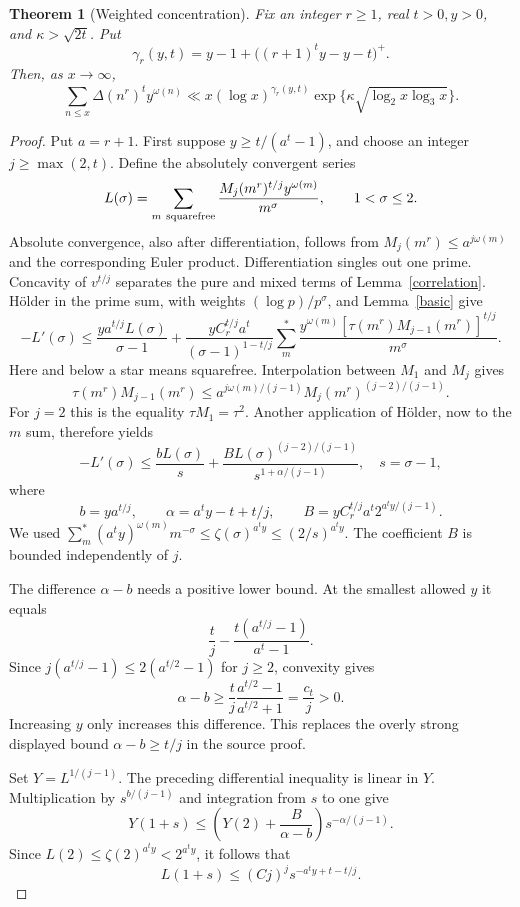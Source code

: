 \documentclass[11pt,a4paper]{article}
\newtheorem{theorem}{Theorem}
\newcommand{\Del}{\Delta}
\newcommand{\om}{\omega}
\begin{document}
\begin{theorem}[Weighted concentration]\label{moment}
Fix an integer $r\ge1$, real $t>0,y>0$, and $\kappa>\sqrt{2t}$.
Put
\[
 \gamma_r(y,t)=y-1+\big((r+1)^t y-y-t\big)^+.
\]
Then, as $x\to\infty$,
\[
 \sum_{n\le x}\Del(n^r)^t y^{\om(n)}
 \ll x(\log x)^{\gamma_r(y,t)}
 \exp\{\kappa\sqrt{\log_2x\log_3x}\}.
\]
\end{theorem}
\begin{proof}
Put $a=r+1$. First suppose $y\ge t/(a^t-1)$, and choose an integer
$j\ge\max(2,t)$. Define the absolutely convergent series
\[
 L(\sigma)=\sum_{m\ {\rm squarefree}}
 \frac{M_j(m^r)^{t/j}y^{\om(m)}}{m^\sigma},\qquad 1<\sigma\le2.
\]
Absolute convergence, also after differentiation, follows from
$M_j(m^r)\le a^{j\om(m)}$ and the corresponding Euler product.
Differentiation singles out one prime. Concavity of $v^{t/j}$ separates
the pure and mixed terms of Lemma~\ref{correlation}. H\"older in the
prime sum, with weights $(\log p)/p^\sigma$, and Lemma~\ref{basic} give
\[
 -L'(\sigma)\le
 \frac{ya^{t/j}L(\sigma)}{\sigma-1}
 +\frac{yC_r^{t/j}a^t}{(\sigma-1)^{1-t/j}}
 \sum_m^*\frac{y^{\om(m)}
 [\tau(m^r)M_{j-1}(m^r)]^{t/j}}{m^\sigma}.
\]
Here and below a star means squarefree. Interpolation between $M_1$
and $M_j$ gives
\[
 \tau(m^r)M_{j-1}(m^r)
 \le a^{j\om(m)/(j-1)}M_j(m^r)^{(j-2)/(j-1)}.
\]
For $j=2$ this is the equality $\tau M_1=\tau^2$.
Another application of H\"older, now to the $m$ sum, therefore yields
\[
 -L'(\sigma)\le\frac{bL(\sigma)}s
 +\frac{BL(\sigma)^{(j-2)/(j-1)}}{s^{1+\alpha/(j-1)}},
 \quad s=\sigma-1,
\]
where
\[
 b=ya^{t/j},\qquad \alpha=a^ty-t+t/j,\qquad
 B=yC_r^{t/j}a^t2^{a^ty/(j-1)}.
\]
We used
$\sum_m^*(a^ty)^{\om(m)}m^{-\sigma}\le\zeta(\sigma)^{a^ty}
\le(2/s)^{a^ty}$. The coefficient $B$ is bounded independently of $j$.

The difference $\alpha-b$ needs a positive lower bound. At the smallest
allowed $y$ it equals
\[
 \frac tj-\frac{t(a^{t/j}-1)}{a^t-1}.
\]
Since $j(a^{t/j}-1)\le2(a^{t/2}-1)$ for $j\ge2$, convexity gives
\[
 \alpha-b\ge\frac tj\frac{a^{t/2}-1}{a^{t/2}+1}=\frac{c_t}{j}>0.
\]
Increasing $y$ only increases this difference. This replaces the overly
strong displayed bound $\alpha-b\ge t/j$ in the source proof.

Set $Y=L^{1/(j-1)}$. The preceding differential inequality is linear
in $Y$. Multiplication by $s^{b/(j-1)}$ and integration from $s$ to one
give
\[
 Y(1+s)\le
 \left(Y(2)+\frac B{\alpha-b}\right)s^{-\alpha/(j-1)}.
\]
Since $L(2)\le\zeta(2)^{a^ty}<2^{a^ty}$, it follows that
\[
 L(1+s)\le(Cj)^j s^{-a^ty+t-t/j}.
\]


\end{proof}
\end{document}

